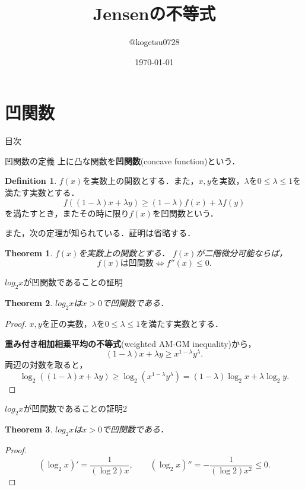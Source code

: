 \documentclass[dvipdfmx,aspectratio=169]{beamer}
\title{
    Jensenの不等式
}
\author{@kogetsu0728}
\date{\today}
\theoremstyle{plain}
\newtheorem{thm}{Theorem}
\theoremstyle{definition}
\newtheorem{dfn}{Definition}
\begin{document}
\maketitle

\section{凹関数}
\begin{frame}{目次}
	\tableofcontents[currentsection]
\end{frame}

\begin{frame}{凹関数の定義}
    上に凸な関数を\textbf{凹関数}(concave function)という\cite{lit:proof}．
    \begin{dfn}
        $f(x)$を実数上の関数とする．また，$x,y$を実数，$\lambda$を$0 \le \lambda \le 1$を満たす実数とする．
        \[
            f((1-\lambda)x + \lambda y) \ge (1-\lambda)f(x) + \lambda f(y)
        \]
        を満たすとき，またその時に限り$f(x)$を凹関数という．
    \end{dfn}

    また，次の定理が知られている．証明は省略する．
    \begin{thm}
        $f(x)$を実数上の関数とする． $f(x)$が二階微分可能ならば，
        \[
            \text{$f(x)$は凹関数} \iff f''(x) \le 0.
        \]
    \end{thm}
\end{frame}

\begin{frame}{$log_2 x$が凹関数であることの証明}
    \begin{thm}
        $log_2 x$は$x > 0$で凹関数である．
    \end{thm}

    \begin{proof}
        $x,y$を正の実数，$\lambda$を$0 \le \lambda \le 1$を満たす実数とする．

        \textbf{重み付き相加相乗平均の不等式}(weighted AM-GM inequality)から，
        \[
            (1-\lambda)x + \lambda y \ge x^{1-\lambda} y^\lambda.
        \]
        両辺の対数を取ると，
        \[
            \log_2 ((1-\lambda)x + \lambda y) \ge \log_2 (x^{1-\lambda} y^\lambda) = (1-\lambda)\log_2 x + \lambda \log_2 y.
        \]
    \end{proof}
\end{frame}

\begin{frame}{$log_2 x$が凹関数であることの証明2}
    \begin{thm}
        $log_2 x$は$x > 0$で凹関数である．
    \end{thm}

    \begin{proof}
        \[
            (\log_2 x)' = \frac{1}{(\log 2)x}, \qquad
            (\log_2 x)'' = -\frac{1}{(\log 2)x^2} \le 0.
        \]
    \end{proof}
\end{frame}
\end{document}
